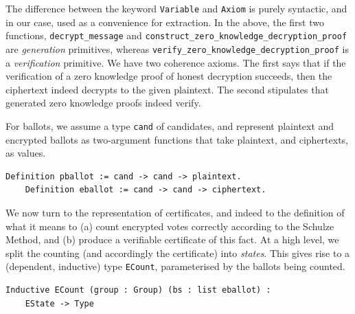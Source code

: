 \noindent
The difference between the keyword \texttt{Variable} and \texttt{Axiom}
is purely syntactic, and in our case, used as a convenience for 
extraction. In
the above, the first two functions, \texttt{decrypt\_message} and
\texttt{construct\_zero\_knowledge\_decryption\_proof} are
\emph{generation} primitives, whereas 
\texttt{verify\_zero\_knowledge\_decryption\_proof} is a
\emph{verification} primitive. We have two coherence axioms. The
first says that if the verification of a zero knowledge proof of
honest decryption succeeds, then the ciphertext indeed decrypts to
the given plaintext. The second stipulates that generated zero
knowledge proofs indeed verify. 

For ballots, we assume a type \texttt{cand} of candidates, and
represent plaintext and encrypted ballots as two-argument functions
that take plaintext, and ciphertexts, as values. 
\begin{lstlisting}[frame=single,basicstyle=\ttfamily\footnotesize]
    Definition pballot := cand -> cand -> plaintext.
    Definition eballot := cand -> cand -> ciphertext.
\end{lstlisting}
\noindent
  We now turn to the representation of certificates, and indeed to the
  definition of what it means to (a) count encrypted votes correctly
  according to the Schulze Method, and (b) produce a verifiable
  certificate of this fact. At a high level, we split the counting
  (and accordingly the certificate) into \emph{states}. This gives
  rise to a (dependent, inductive) type \texttt{ECount}, parameterised
  by the ballots being counted.

  \begin{lstlisting}[frame=single,basicstyle=\ttfamily\footnotesize]
  Inductive ECount (group : Group) (bs : list eballot) : 
    EState -> Type
  \end{lstlisting}

